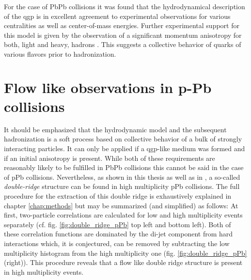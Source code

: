 For the case of \gls{PbPb} collisions it was found that the hydrodynamical description of the \gls{qgp} is in excellent agreement to experimental observations for various centralities as well as center-of-mass energies\cite{Manly2006}. Further experimental support for this model is given by the observation of a significant momentum anisotropy for both, light and heavy, hadrons \cite{dEnterria2007}. This suggests a collective behavior of quarks of various flavors prior to hadronization. 




\section{Flow like observations in p-Pb collisions}
\label{sec:flow-like-pPb}

It should be emphasized that the hydrodynamic model and the subsequent hadronization is a soft process based on collective behavior of a bulk of strongly interacting particles. It can only be applied if a \gls{qgp}-like medium was formed and if an initial anisotropy is present. While both of these requirements are reasonably likely to be fulfilled in PbPb collisions this cannot be said in the case of \gls{pPb} collisions. Nevertheless, as shown in this thesis as well as in \cite{Abelev2012}, a so-called  \emph{double-ridge} structure can be found in high multiplicity \gls{pPb} collisions. The full procedure for the extraction of this double ridge is exhaustively explained in chapter \ref{chap:methods} but may be summarized (and simplified) as follows: At first, two-particle correlations are calculated for low and high multiplicity events separately (cf. fig. \ref{fig:double_ridge_pPb} top left and bottom left). Both of these correlation functions are dominated by the di-jet component from hard interactions which, it is conjectured, can be removed by subtracting the low multiplicity histogram from the high multiplicity one (fig. \ref{fig:double_ridge_pPb} (right)). This procedure reveals that a flow like double ridge structure is present in high multiplicity events. 

